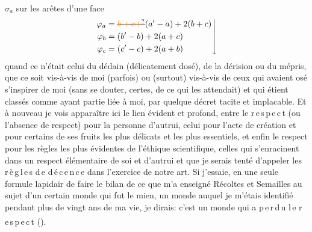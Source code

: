  $\sigma_a$ sur les arêtes d'une face
\[
\left.\begin{aligned}
\varphi_a&=\deleted{\unsure{b+c+}}(a'-a)+2(b+c)\\
\varphi_b&=(b'-b)+2(a+c)\\
\varphi_c&=(c'-c)+2(a+b)
\end{aligned}\right\downarrow
\]
quand ce n'était celui du dédain (délicatement dosé), de la dérision ou du mépris, que ce soit vis-à-vis de moi (parfois) ou (surtout) vis-à-vis de ceux qui avaient osé s'inspirer de moi (sans se douter, certes, de ce qui les attendait) et qui étient classés comme ayant partie liée à moi, par quelque décret tacite et implacable. Et à nouveau je vois apparaître ici le lien évident et profond, entre le \mbox{r\,e\,s\,p\,e\,c\,t} (ou l'absence de respect) pour la personne d'autrui, celui pour l'acte de création et pour certains de ses fruits  les plus délicats et les plus essentiels, et enfin le respect pour les règles les plus évidentes de l'éthique scientifique, celles qui s'enracinent dans un respect élémentaire de soi et d'autrui et que je serais tenté d'appeler les \mbox{r\,è\,g\,l\,e\,s} \mbox{d\,e} \mbox{d\,é\,c\,e\,n\,c\,e} dans l'exercice de notre art.  Si j'essaie, en une seule formule lapidair de faire le bilan de ce que m'a enseigné Récoltes et Semailles au sujet d'un certain monde qui fut le mien, un monde auquel je m'étais identifié pendant plus de vingt ans de ma vie, je dirais: c'est un monde qui a \mbox{p\,e\,r\,d\,u} \mbox{l\,e} \mbox{r\,e\,s\,p\,e\,c\,t} (\textsuperscript{}).

